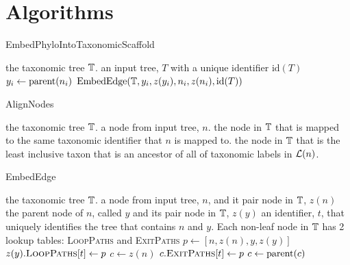 \documentclass[11pt]{article}
\begin{document}
\section{Algorithms}
\begin{algorithm} \caption{EmbedPhyloIntoTaxonomicScaffold}\label{embedTree} \begin{algorithmic}
\REQUIRE the taxonomic tree $\mathbb{T}$.
\REQUIRE an input tree, $T$ with a unique identifier $\mbox{id}(T)$
\ENDFOR
{}
    \STATE $y_i \leftarrow \mbox{parent}(n_i)$
    \STATE$\mbox{EmbedEdge}(\mathbb{T}, {y_i}, z(y_i), n_i, z(n_i), \mbox{id}(T))$
    \ENDIF
\ENDFOR
\end{algorithmic}\end{algorithm}
\begin{algorithm} \caption{AlignNodes}\label{alignNodes} \begin{algorithmic}
\REQUIRE the taxonomic tree $\mathbb{T}$.
\REQUIRE a node from input tree, $n$.
    \RETURN the node in $\mathbb{T}$ that is mapped to the same taxonomic identifier that $n$ is mapped to.
\ELSE
    \RETURN the node in $\mathbb{T}$ that is the least inclusive taxon that is an ancestor of all of 
    taxonomic labels in $\mathcal{L}(n)$.
\ENDIF
\end{algorithmic}\end{algorithm}
\begin{algorithm} \caption{EmbedEdge}\label{embedEdge} \begin{algorithmic}
\REQUIRE the taxonomic tree $\mathbb{T}$.
\REQUIRE a node from input tree, $n$, and it pair node in $\mathbb{T}$, $z(n)$
\REQUIRE the parent node of $n$, called $y$ and its pair node in $\mathbb{T}$, $z(y)$
\REQUIRE an identifier, $t$, that uniquely identifies the tree that contains $n$ and $y$.
\REQUIRE Each non-leaf node in $\mathbb{T}$ has 2 lookup tables: \textsc{LoopPaths} and \textsc{ExitPaths}
\STATE $p \leftarrow \left[n, z(n), y, z(y)\right]$ 
    \STATE $z(y).\textsc{LoopPaths}[t] \leftarrow p$
\ELSE
    \STATE $c\leftarrow z(n)$
        \STATE $c.\textsc{ExitPaths}[t] \leftarrow p$
        \STATE $c \leftarrow \mbox{parent}(c)$
    \ENDWHILE
\ENDIF
\end{algorithmic}
\end{algorithm}
\end{document}
